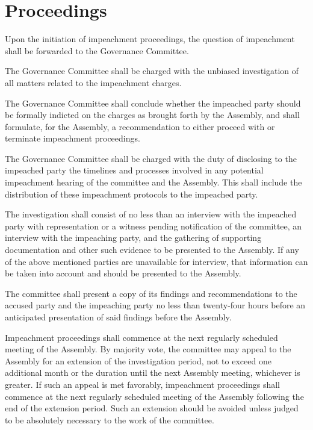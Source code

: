 \section{Proceedings}
\begin{bylaws-number}
	\item Upon the initiation of impeachment proceedings, the question of impeachment shall be forwarded to the Governance Committee.
	\item The Governance Committee shall be charged with the unbiased investigation of all matters related to the impeachment charges.
	\begin{bylaws-number}
		\item The Governance Committee shall conclude whether the impeached party should be formally indicted on the charges as brought forth by the Assembly, and shall formulate, for the Assembly, a recommendation to either proceed with or terminate impeachment proceedings.
		\item The Governance Committee shall be charged with the duty of disclosing to the impeached party the timelines and processes involved in any potential impeachment hearing of the committee and the Assembly. This shall include the distribution of these impeachment protocols to the impeached party.
		\item The investigation shall consist of no less than an interview with the impeached party with representation or a witness pending notification of the committee, an interview with the impeaching party, and the gathering of supporting documentation and other such evidence to be presented to the Assembly. If any of the above mentioned parties are unavailable for interview, that information can be taken into account and should be presented to the Assembly.
		\item The committee shall present a copy of its findings and recommendations to the accused party and the impeaching party no less than twenty-four hours before an anticipated presentation of said findings before the Assembly.
	\end{bylaws-number}
	\item Impeachment proceedings shall commence at the next regularly scheduled meeting of the Assembly. By majority vote, the committee may appeal to the Assembly for an extension of the investigation period, not to exceed one additional month or the duration until the next Assembly meeting, whichever is greater. If such an appeal is met favorably, impeachment proceedings shall commence at the next regularly scheduled meeting of the Assembly following the end of the extension period. Such an extension should be avoided unless judged to be absolutely necessary to the work of the committee.

\end{bylaws-number}
